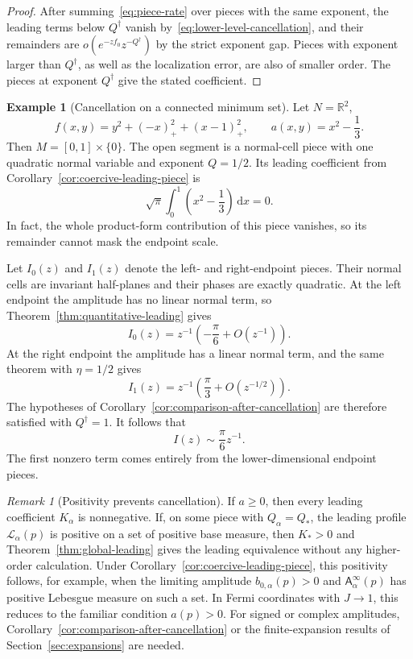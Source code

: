 \documentclass[11pt]{amsart}
\numberwithin{equation}{section}
\theoremstyle{definition}
\newtheorem{example}[theorem]{Example}
\theoremstyle{remark}
\newtheorem{remark}[theorem]{Remark}
\newcommand{\R}{\mathbb{R}}
\newcommand{\dd}{\,\mathrm{d}}
\newcommand{\Afib}{\mathsf{A}}
\newcommand{\cL}{\mathcal{L}}
\begin{document}
\begin{proof}
After summing~\eqref{eq:piece-rate} over pieces with the same exponent, the
leading terms below $Q^\dagger$ vanish by~\eqref{eq:lower-level-cancellation},
and their remainders are $o(e^{-zf_0}z^{-Q^\dagger})$ by the strict exponent
gap.  Pieces with exponent larger than $Q^\dagger$, as well as the localization
error, are also of smaller order.  The pieces at exponent $Q^\dagger$ give the
stated coefficient.
\end{proof}

\begin{example}[Cancellation on a connected minimum set]\label{ex:cancellation}
Let $N=\R^2$,
\[
 f(x,y)=y^2+(-x)_+^2+(x-1)_+^2,
 \qquad
 a(x,y)=x^2-\frac13.
\]
Then $M=[0,1]\times\{0\}$.  The open segment is a normal-cell piece with one
quadratic normal variable and exponent $Q=1/2$.  Its leading coefficient from
Corollary~\ref{cor:coercive-leading-piece} is
\[
 \sqrt\pi\int_0^1\left(x^2-\frac13\right)\dd x=0.
\]
In fact, the whole product-form contribution of this piece vanishes, so its
remainder cannot mask the endpoint scale.

Let $I_0(z)$ and $I_1(z)$ denote the left- and right-endpoint pieces.  Their
normal cells are invariant half-planes and their phases are exactly
quadratic.  At the left endpoint the amplitude has no linear normal term, so
Theorem~\ref{thm:quantitative-leading} gives
\[
 I_0(z)=z^{-1}\left(-\frac{\pi}{6}+O(z^{-1})\right).
\]
At the right endpoint the amplitude has a linear normal term, and the same
theorem with $\eta=1/2$ gives
\[
 I_1(z)=z^{-1}\left(\frac{\pi}{3}+O(z^{-1/2})\right).
\]
The hypotheses of
Corollary~\ref{cor:comparison-after-cancellation} are therefore satisfied with
$Q^\dagger=1$.  It follows that
\[
 I(z)\sim\frac{\pi}{6}z^{-1}.
\]
The first nonzero term comes entirely from the lower-dimensional endpoint
pieces.
\end{example}

\begin{remark}[Positivity prevents cancellation]\label{rem:positivity}
If $a\ge0$, then every leading coefficient $K_\alpha$ is nonnegative.  If, on
some piece with $Q_\alpha=Q_*$, the leading profile $\cL_\alpha(p)$ is positive
on a set of positive base measure, then $K_*>0$ and
Theorem~\ref{thm:global-leading} gives the leading equivalence without any
higher-order calculation.  Under Corollary~\ref{cor:coercive-leading-piece}, this positivity follows,
for example, when the limiting amplitude $b_{0,\alpha}(p)>0$ and $\Afib_\alpha^\infty(p)$ has positive
Lebesgue measure on such a set.  In Fermi coordinates with $J\to1$, this reduces
to the familiar condition $a(p)>0$.  For signed or complex amplitudes,
Corollary~\ref{cor:comparison-after-cancellation} or the finite-expansion
results of Section~\ref{sec:expansions} are needed.
\end{remark}
\end{document}
